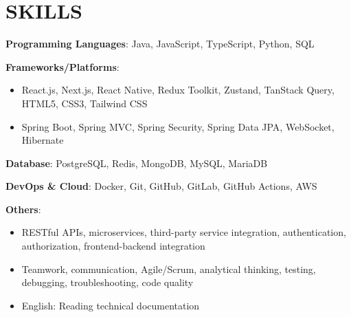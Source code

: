 \section{SKILLS}
\resumeSubHeadingListStart

  \item
    \resumeItemListStart
      \item \textbf{Programming Languages}: Java, JavaScript, TypeScript, Python, SQL
      \item \textbf{Frameworks/Platforms}:
        \begin{itemize}
          \item React.js, Next.js, React Native, Redux Toolkit, Zustand, TanStack Query, HTML5, CSS3, Tailwind CSS
          \item Spring Boot, Spring MVC, Spring Security, Spring Data JPA, WebSocket, Hibernate
        \end{itemize}
      \item \textbf{Database}: PostgreSQL, Redis, MongoDB, MySQL, MariaDB
      \item \textbf{DevOps \& Cloud}: Docker, Git, GitHub, GitLab, GitHub Actions, AWS
      \item \textbf{Others}:
        \begin{itemize}
          \item RESTful APIs, microservices, third-party service integration, authentication, authorization, frontend-backend integration
          \item Teamwork, communication, Agile/Scrum, analytical thinking, testing, debugging, troubleshooting, code quality
          \item English: Reading technical documentation
        \end{itemize}
    \resumeItemListEnd

\resumeSubHeadingListEnd

